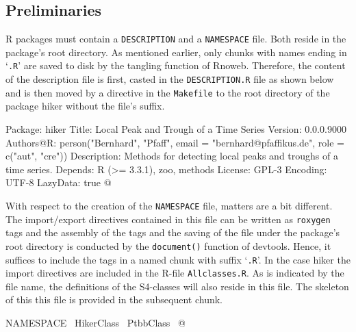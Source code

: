 \documentclass[a4paper]{article}
\newcommand{\pkg}[1]{{\fontseries{b}\selectfont #1}}
\begin{document}
\subsection{Preliminaries}
\label{S3SS1}

R packages must contain a \verb?DESCRIPTION? and a \verb?NAMESPACE?
file. Both reside in the package's root directory. As mentioned
earlier, only chunks with names ending in `\verb?.R?' are saved to disk
by the tangling function of \pkg{Rnoweb}. Therefore, the content
of the description file is first, casted in the \verb?DESCRIPTION.R?
file as shown below and is then moved by a directive in the
\verb?Makefile? to the root directory of the package \pkg{hiker} without
the file's suffix.

\nwenddocs{}\endmoddef\let\nwnotused=\nwoutput{}
Package: hiker
Title: Local Peak and Trough of a Time Series
Version: 0.0.0.9000
Authors@R: person("Bernhard", "Pfaff", email = "bernhard@pfaffikus.de",
                  role = c("aut", "cre"))
Description: Methods for detecting local peaks and troughs of a time series.
Depends: R (>= 3.3.1), zoo, methods
License: GPL-3
Encoding: UTF-8
LazyData: true
\nwnotused{DESCRIPTION.R}\nwendcode{}@

With respect to the creation of the \verb?NAMESPACE? file, matters are a
bit different. The import/export directives contained in this file can
be written as \verb?roxygen? tags and the assembly of the tags and the
saving of the file under the package's root directory is conducted by
the \verb?document()? function of \pkg{devtools}. Hence, it suffices to
include the tags in a named chunk with suffix `\verb?.R?'. In the case
\pkg{hiker} the import directives are included in the R-file
\verb?Allclasses.R?. As is indicated by the file name, the definitions of
the S4-classes will also reside in this file. The skeleton of this
this file is provided in the subsequent chunk.

\nwenddocs{}\endmoddef\let\nwnotused=\nwoutput{}
\LA{}NAMESPACE~{\nwtagstyle{}}\RA{}
\LA{}HikerClass~{\nwtagstyle{}}\RA{}
\LA{}PtbbClass~{\nwtagstyle{}}\RA{}
\nwnotused{Allclasses.R}\nwendcode{}@
\end{document}
